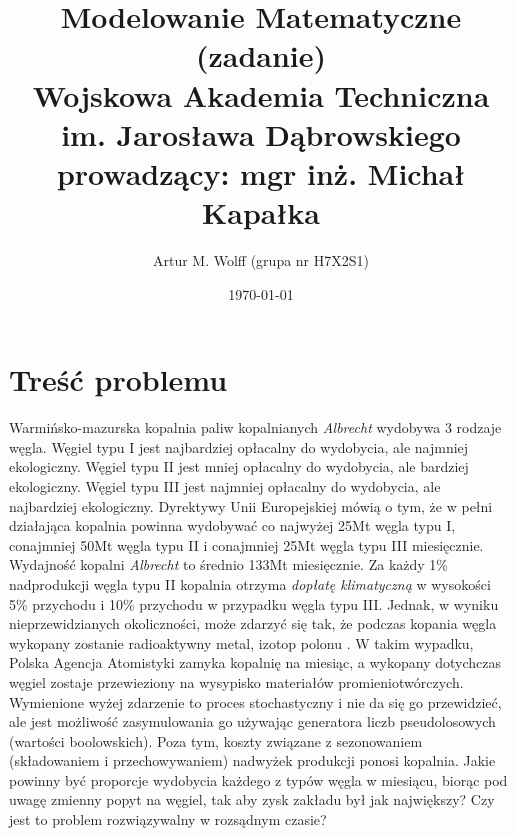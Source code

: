 \documentclass[titlepage]{article}
\title{
	\Large{Modelowanie Matematyczne (zadanie)}
	\\
	\normalsize{Wojskowa Akademia Techniczna im. Jarosława Dąbrowskiego}
	\\
	\normalsize{prowadzący: mgr inż. Michał Kapałka}
	}
\author{Artur M. Wolff (grupa nr H7X2S1)}
\date{\today}
\begin{document}
\maketitle

\section{Treść problemu}
Warmińsko-mazurska kopalnia paliw kopalnianych \textit{Albrecht} wydobywa 3 rodzaje węgla.
Węgiel typu I jest najbardziej opłacalny do wydobycia, ale najmniej ekologiczny.
Węgiel typu II jest mniej opłacalny do wydobycia, ale bardziej ekologiczny.
Węgiel typu III jest najmniej opłacalny do wydobycia, ale najbardziej ekologiczny.
Dyrektywy Unii Europejskiej mówią o tym, że w pełni działająca kopalnia powinna wydobywać co najwyżej 25Mt węgla typu I, conajmniej 50Mt węgla typu II i conajmniej 25Mt węgla typu III miesięcznie.
Wydajność kopalni \textit{Albrecht} to średnio 133Mt miesięcznie.
Za każdy 1\% nadprodukcji węgla typu II kopalnia otrzyma \textit{dopłatę klimatyczną} w wysokości 5\% przychodu i 10\% przychodu w przypadku węgla typu III.
Jednak, w wyniku nieprzewidzianych okoliczności, może zdarzyć się tak, że podczas kopania węgla wykopany zostanie radioaktywny metal, izotop polonu .
W takim wypadku, Polska Agencja Atomistyki zamyka kopalnię na miesiąc, a wykopany dotychczas węgiel zostaje przewieziony na wysypisko materiałów promieniotwórczych.
Wymienione wyżej zdarzenie to proces stochastyczny i nie da się go przewidzieć, ale jest możliwość zasymulowania go używając generatora liczb pseudolosowych (wartości boolowskich).
Poza tym, koszty związane z sezonowaniem (składowaniem i przechowywaniem) nadwyżek produkcji ponosi kopalnia.
Jakie powinny być proporcje wydobycia każdego z typów węgla w miesiącu, biorąc pod uwagę zmienny popyt na węgiel, tak aby zysk zakładu był jak największy?
Czy jest to problem rozwiązywalny w rozsądnym czasie?
\end{document}

